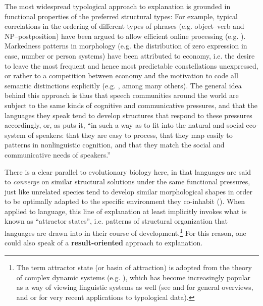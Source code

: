 \documentclass[output=paper]{langsci/langscibook}
\begin{document}
The most widespread typological approach to explanation is grounded in functional properties of the preferred structural types: For example, typical correlations in the ordering of different types of phrases (e.g. object–verb and NP–postposition) have been argued to allow efficient online processing (e.g. \citealt{Hawkins1994_Perf,Hawkins2004_Eff}). Markedness patterns in morphology (e.g. the distribution of zero expression in case, number or person systems) have been attributed to economy, i.e. the desire to leave the most frequent and hence most predictable constellations unexpressed, or rather to a competition between economy and the motivation to code all semantic distinctions explicitly (e.g. \citealt{Haiman1983,Comrie1989,Aissen2003,Croft2003,Haspelmath2008_Econ}, among many others). The general idea behind this approach is thus that speech communities around the world are subject to the same kinds of cognitive and communicative pressures, and that the languages they speak tend to develop structures that respond to these pressures accordingly, or, as \citet[118]{Bickel2014} puts it, “in such a way as to fit into the natural and social eco-system of speakers: that they are easy to process, that they map easily to patterns in nonlinguistic cognition, and that they match the social and communicative needs of speakers.” 

There is a clear parallel to evolutionary biology here, in that languages are said to \textit{converge} on similar structural solutions under the same functional pressures, just like unrelated species tend to develop similar morphological shapes in order to be optimally adapted to the specific environment they co-inhabit (\citealt{Deacon1997,Caldwell2008,EvansLevinson2009,Givón2010}). When applied to language, this line of explanation at least implicitly invokes what is known as “attractor states”, i.e. patterns of structural organization that languages are drawn into in their course of development.\footnote{The term attractor state (or basin of attraction) is adopted from the theory of complex dynamic systems (e.g.  \citealt{Cooper1999,HoweLewis2005,Holland2006}), which has become increasingly popular as a way of viewing linguistic systems as well (see \citealt{BecknerEtAl2009} and \citealt{Port2009} for general overviews, and \citealt{Haig2018} or \citealt{Nichols2018} for very recent applications to typological data).} For this reason, one could also speak of a \textbf{result-oriented} approach to explanation. 
\end{document}
